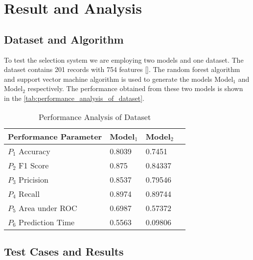 \section{Result and Analysis}\label{sec:result_and_analysis}

\subsection{Dataset and Algorithm}\label{subsec:dataset_and_algorithm}

To test the selection system we are employing two models and one dataset. The dataset contains 201 records with 754 features []. The random forest algorithm and support vector machine algorithm is used to generate the models Model$_1$ and Model$_2$ respectively. The performance obtained from these two models is shown in the \autoref{tab:performance_analysis_of_dataset}.

\begin{table}[ht]
    \caption{Performance Analysis of Dataset}\label{tab:performance_analysis_of_dataset}
    \begin{tabular*}{\tblwidth}{@{}LLLL@{}}
        \toprule
        Performance Parameter & Model$_1$ & Model$_2$ \\
        \midrule
        $P_1$ \quad Accuracy & 0.8039 & 0.7451 \\
        $P_2$ \quad F1 Score & 0.875 & 0.84337 \\
        $P_3$ \quad Pricision & 0.8537 & 0.79546 \\
        $P_4$ \quad Recall & 0.8974 & 0.89744 \\
        $P_5$ \quad Area under ROC & 0.6987 & 0.57372 \\
        $P_6$ \quad Prediction Time & 0.5563 & 0.09806 \\
        \bottomrule
    \end{tabular*}
\end{table}

\subsection{Test Cases and Results}\label{subsec:test_cases_and_results}

